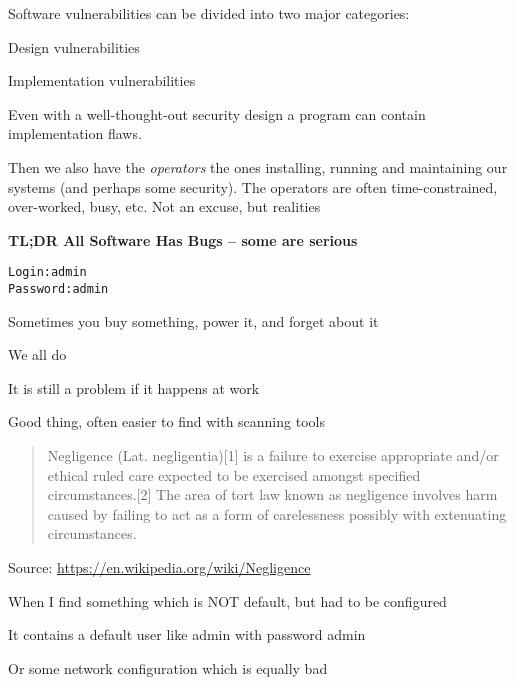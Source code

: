 \documentclass[Screen16to9,17pt]{foils}
\begin{document}
Software vulnerabilities can be divided into two major categories:
\begin{list2}
\item Design vulnerabilities
\item Implementation vulnerabilities
\end{list2}

Even with a well-thought-out security design a program can contain implementation flaws.

Then we also have the \emph{operators} the ones installing, running and maintaining our systems (and perhaps some security). The operators are often time-constrained, over-worked, busy, etc. Not an excuse, but realities

{\bf\Large TL;DR All Software Has Bugs -- some are serious}



\begin{alltt}
Login: admin
Password: admin
\end{alltt}

\begin{list2}
\item Sometimes you buy something, power it, and forget about it
\item We all do
\item It is still a problem if it happens at work
\item Good thing, often easier to find with scanning tools
\end{list2}




\begin{quote}
Negligence (Lat. negligentia)[1] is a failure to exercise appropriate and/or ethical ruled care expected to be exercised amongst specified circumstances.[2] The area of tort law known as negligence involves harm caused by failing to act as a form of carelessness possibly with extenuating circumstances.
\end{quote}
Source: \url{https://en.wikipedia.org/wiki/Negligence}


\begin{list2}
\item When I find something which is NOT default, but had to be configured
\item It contains a default user like admin with password admin
\item Or some network configuration which is equally bad
\end{list2}
\end{document}
